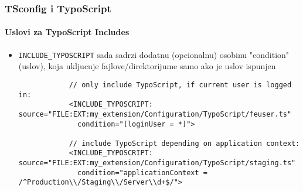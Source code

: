 \begin{frame}[fragile]
	\frametitle{TSconfig i TypoScript}
	\framesubtitle{Uslovi za TypoScript Includes}

	\lstset{basicstyle=\tiny\ttfamily}

	\begin{itemize}

		\item \texttt{INCLUDE\_TYPOSCRIPT} sada sadrzi dodatnu (opcionalnu) osobinu "condition" (uslov), koja ukljucuje fajlove/direktorijume samo ako je uslov ispunjen

		\begin{lstlisting}
			// only include TypoScript, if current user is logged in:
			<INCLUDE_TYPOSCRIPT: source="FILE:EXT:my_extension/Configuration/TypoScript/feuser.ts"
			  condition="[loginUser = *]">

			// include TypoScript depending on application context:
			<INCLUDE_TYPOSCRIPT: source="FILE:EXT:my_extension/Configuration/TypoScript/staging.ts"
			  condition="applicationContext = /^Production\\/Staging\\/Server\\d+$/">
		\end{lstlisting}

	\end{itemize}

\end{frame}

